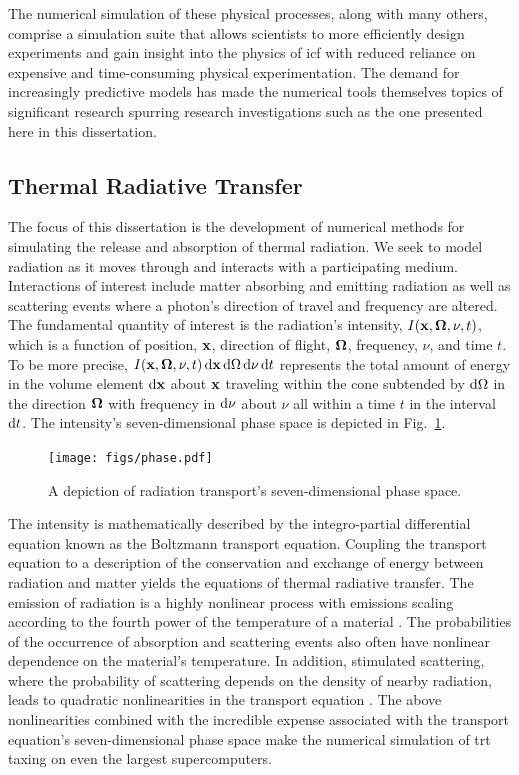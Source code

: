 \documentclass[../doc.tex]{subfiles}
\begin{document}
The numerical simulation of these physical processes, along with many others, comprise a simulation suite that allows scientists to more efficiently design experiments and gain insight into the physics of \gls{icf} with reduced reliance on expensive and time-consuming physical experimentation. 
The demand for increasingly predictive models has made the numerical tools themselves topics of significant research spurring research investigations such as the one presented here in this dissertation.  

\subsection{Thermal Radiative Transfer}
The focus of this dissertation is the development of numerical methods for simulating the release and absorption of thermal radiation. We seek to model radiation as it moves through and interacts with a participating medium. 
Interactions of interest include matter absorbing and emitting radiation as well as scattering events where a photon's direction of travel and frequency are altered. 
The fundamental quantity of interest is the radiation's intensity, $I(\boldsymbol{\mathrm{x}},\boldsymbol{\Omega},\nu,t)$, which is a function of position, $\boldsymbol{\mathrm{x}}$, direction of flight, $\boldsymbol{\Omega}$, frequency, $\nu$, and time $t$. To be more precise, $I(\boldsymbol{\mathrm{x}},\boldsymbol{\Omega},\nu,t) \mathop{}\!\mathrm{d}\boldsymbol{\mathrm{x}}\mathop{}\!\mathrm{d}\Omega\mathop{}\!\mathrm{d}\nu\mathop{}\!\mathrm{d} t$ represents the total amount of energy in the volume element $\mathop{}\!\mathrm{d}\boldsymbol{\mathrm{x}}$ about $\boldsymbol{\mathrm{x}}$ traveling within the cone subtended by $\mathop{}\!\mathrm{d}\Omega$ in the direction $\boldsymbol{\Omega}$ with frequency in $\mathop{}\!\mathrm{d} \nu$ about $\nu$ all within a time $t$ in the interval $\mathop{}\!\mathrm{d} t$. 
The intensity's seven-dimensional phase space is depicted in Fig.~\ref{intro:phase}. 
\begin{figure}
\centering
\texttt{[image: figs/phase.pdf]}
\caption{A depiction of radiation transport's seven-dimensional phase space. }
\label{intro:phase}
\end{figure}

The intensity is mathematically described by the integro-partial differential equation known as the Boltzmann transport equation. 
Coupling the transport equation to a description of the conservation and exchange of energy between radiation and matter yields the equations of thermal radiative transfer. 
The emission of radiation is a highly nonlinear process with emissions scaling according to the fourth power of the temperature of a material \cite{pomraning2005equations}. The probabilities of the occurrence of absorption and scattering events also often have nonlinear dependence on the material's temperature. 
In addition, stimulated scattering, where the probability of scattering depends on the density of nearby radiation, leads to quadratic nonlinearities in the transport equation \cite{1986JQSRT..36..273K}. 
The above nonlinearities combined with the incredible expense associated with the transport equation's seven-dimensional phase space make the numerical simulation of \gls{trt} taxing on even the largest supercomputers. 
\end{document}
